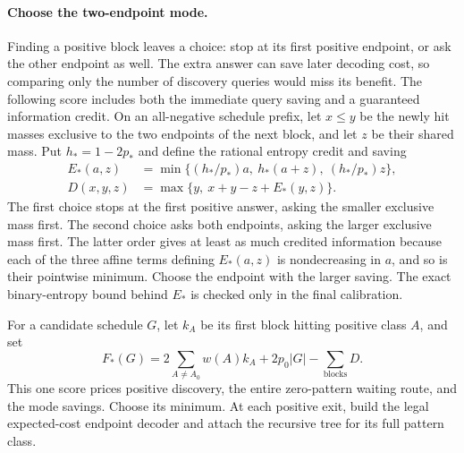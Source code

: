 \paragraph{Choose the two-endpoint mode.}
Finding a positive block leaves a choice: stop at its first positive
endpoint, or ask the other endpoint as well. The extra answer can
save later decoding cost, so comparing only the number of discovery
queries would miss its benefit. The following score includes both
the immediate query saving and a guaranteed information credit.
On an all-negative schedule prefix, let $x\le y$ be the newly hit
masses exclusive to the two endpoints of the next block, and let
$z$ be their shared mass. Put $h_*=1-2p_*$ and define the rational
entropy credit and saving
\begin{equation}\label{eq:rational-block-saving}
 \begin{aligned}
 E_*(a,z)&=\min\{(h_*/p_*)a,\ h_*(a+z),\ (h_*/p_*)z\},\\
 D(x,y,z)&=\max\{y,\ x+y-z+E_*(y,z)\}.
 \end{aligned}
\end{equation}
The first choice stops at the first positive answer, asking the
smaller exclusive mass first. The second choice asks both endpoints,
asking the larger exclusive mass first. The latter order gives at
least as much credited information because each of the three affine
terms defining $E_*(a,z)$ is nondecreasing in $a$, and so is their
pointwise minimum. Choose the endpoint with the larger saving.
The exact binary-entropy bound behind $E_*$ is checked
only in the final calibration.

For a candidate schedule $G$, let $k_A$ be its first block hitting
positive class $A$, and set
\begin{equation}\label{eq:adaptive-shift-objective}
 F_*(G)=2\sum_{A\ne A_0}w(A)k_A+2p_0|G|
             -\sum_{\text{blocks}}D.
\end{equation}
This one score prices positive discovery, the entire zero-pattern
waiting route, and the mode savings. Choose its minimum. At each
positive exit, build the legal expected-cost endpoint decoder and
attach the recursive tree for its full pattern class.






